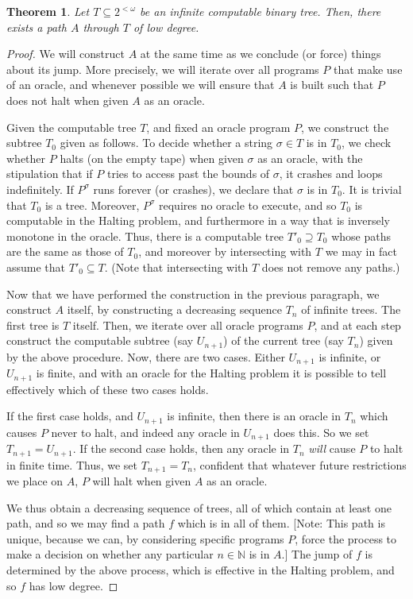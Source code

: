 \documentclass{article}
\newtheorem*{theorem}{Theorem}[subsection]
\theoremstyle{nonumberplain}
\newtheorem{proof}{Proof}
\newcommand{\N}{\mathbb{N}}
\begin{document}
\begin{theorem}
Let $T \subseteq 2^{<\omega}$ be an infinite computable binary tree. Then, there exists a path $A$ through $T$ of low degree.
\end{theorem}

\begin{proof}
We will construct $A$ at the same time as we conclude (or force) things about its jump. More precisely, we will iterate over all programs $P$ that make use of an oracle, and whenever possible we will ensure that $A$ is built such that $P$ does not halt when given $A$ as an oracle.

Given the computable tree $T$, and fixed an oracle program $P$, we construct the subtree $T_0$ given as follows. To decide whether a string $\sigma \in T$ is in $T_0$, we check whether $P$ halts (on the empty tape) when given $\sigma$ as an oracle, with the stipulation that if $P$ tries to access past the bounds of $\sigma$, it crashes and loops indefinitely. If $P^\sigma$ runs forever (or crashes), we declare that $\sigma$ is in $T_0$. It is trivial that $T_0$ is a tree. Moreover, $P^\sigma$ requires no oracle to execute, and so $T_0$ is computable in the Halting problem, and furthermore in a way that is inversely monotone in the oracle. Thus, there is a computable tree $T'_0 \supseteq T_0$ whose paths are the same as those of $T_0$, and moreover by intersecting with $T$ we may in fact assume that $T'_0 \subseteq T$. (Note that intersecting with $T$ does not remove any paths.)

Now that we have performed the construction in the previous paragraph, we construct $A$ itself, by constructing a decreasing sequence $T_n$ of infinite trees. The first tree is $T$ itself. Then, we iterate over all oracle programs $P$, and at each step construct the computable subtree (say $U_{n+1}$) of the current tree (say $T_n$) given by the above procedure. Now, there are two cases. Either $U_{n+1}$ is infinite, or $U_{n+1}$ is finite, and with an oracle for the Halting problem it is possible to tell effectively which of these two cases holds.

If the first case holds, and $U_{n+1}$ is infinite, then there is an oracle in $T_n$ which causes $P$ never to halt, and indeed any oracle in $U_{n+1}$ does this. So we set $T_{n+1} = U_{n+1}$. If the second case holds, then any oracle in $T_n$ \emph{will} cause $P$ to halt in finite time. Thus, we set $T_{n+1} = T_n$, confident that whatever future restrictions we place on $A$, $P$ will halt when given $A$ as an oracle.

We thus obtain a decreasing sequence of trees, all of which contain at least one path, and so we may find a path $f$ which is in all of them. [Note: This path is unique, because we can, by considering specific programs $P$, force the process to make a decision on whether any particular $n \in \N$ is in $A$.] The jump of $f$ is determined by the above process, which is effective in the Halting problem, and so $f$ has low degree.
\end{proof}

%
%
\end{document}
